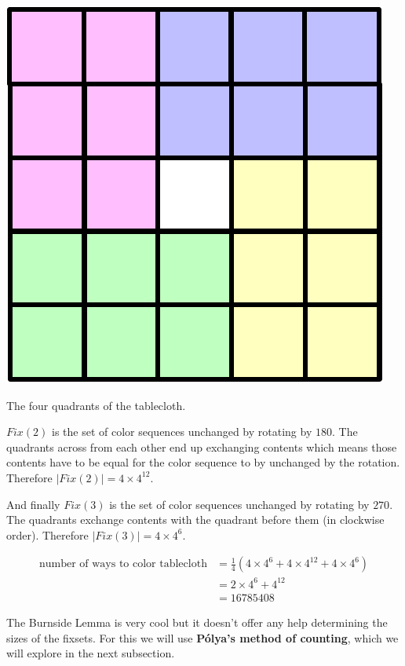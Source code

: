 \begin{marginfigure}[0.5in]
\includegraphics[scale=0.4]{tableclothquadrants}
\caption{The four quadrants of the tablecloth.}
\label{fig:tableclothquadrants}
\end{marginfigure}

$Fix(2)$ is the set of color sequences unchanged by rotating by $180$\textdegree. The quadrants across from each other end up exchanging contents which means those contents have to be equal for the color sequence to by unchanged by the rotation. Therefore $|Fix(2)| = 4 \times 4^{12}$.

And finally $Fix(3)$ is the set of color sequences unchanged by rotating by $270$\textdegree. The quadrants exchange contents with the quadrant before them (in clockwise order). Therefore $|Fix(3)| = 4 \times 4^{6}$.

\begin{align*}
\text{number of ways to color tablecloth} &= \frac{1}{4} (4 \times 4^{6} + 4 \times 4^{12} + 4 \times 4^{6}) \\
                                          &= 2 \times 4^{6} + 4^{12} \\
                                          &= 16785408
\end{align*}

The Burnside Lemma is very cool but it doesn't offer any help determining the sizes of the fixsets. For this we will use \textbf{P\'{o}lya's method of counting}, which we will explore in the next subsection.

